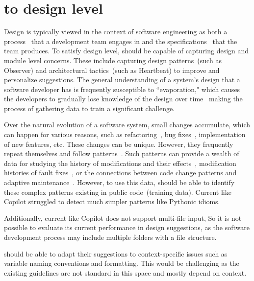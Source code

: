 \section{\cct{} to design level}
\label{cs2design}
Design is typically viewed in the context of software engineering as both a process~\cite{design} that a development team engages in and the specifications~\cite{designdef} that the team produces. 
To satisfy design level, \cct{} should be capable of capturing design and module level concerns. 
These include capturing design patterns~(such as Observer) and architectural tactics~(such as Heartbeat) to improve and personalize suggestions.
The general understanding of a system's design that a software developer has is frequently susceptible to ``evaporation," which causes the developers to gradually lose knowledge of the design over time~\cite{martinse} making the process of gathering data to train \cct{} a significant challenge.

Over the natural evolution of a software system, small changes accumulate, which can happen for various reasons, such as refactoring~\cite{fabio}, bug fixes~\cite{cotroneo}, implementation of new features, etc.
These changes can be unique. However, they frequently repeat themselves and follow patterns~\cite{changes}. 
Such patterns can provide a wealth of data for studying the history of modifications and their effects~\cite{martinchanges}, modification histories of fault fixes~\cite{daniel}, or the connections between code change patterns and adaptive maintenance~\cite{ijece}.
However, to use this data, \cct{} should be able to identify these complex patterns existing in public code~(training data). Current \cct{} like Copilot struggled to detect much simpler patterns like Pythonic idioms.

Additionally, current \cct{} like Copilot does not support multi-file input, So it is not possible to evaluate its current performance in design suggestions, as the software development process may include multiple folders with a file structure. 

\cct{} should be able to adapt their suggestions to context-specific issues such as variable naming conventions and formatting. 
This would be challenging as the existing guidelines are not standard in this space and mostly depend on context.

